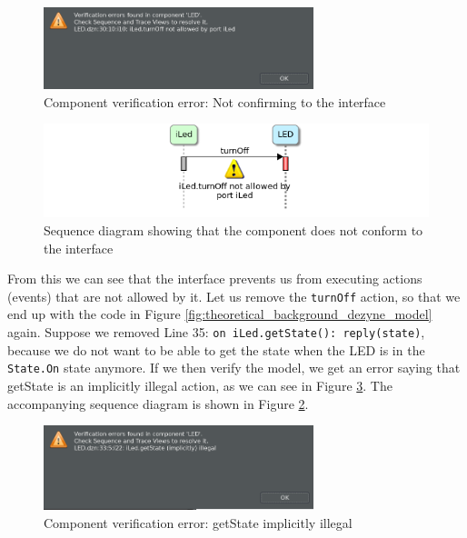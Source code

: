 \documentclass[12pt]{scrreprt}
\begin{document}
\begin{figure}[H]
    \centering
    \includegraphics[width=0.7\textwidth]{Figures/theoretical_background/led_verification_error.png}
    \caption{Component verification error: Not confirming to the interface}
    \label{Component verification error: Not confirming to the interface}
\end{figure}

\begin{figure}[H]
    \centering
    \includegraphics[width=\textwidth]{Figures/theoretical_background/verification_error_in_sequence_diagram.png}
    \caption{Sequence diagram showing that the component does not conform to the interface}
    \label{Sequence diagram showing that the component does not conform to the interface}
\end{figure}

From this we can see that the interface prevents us from executing actions (events) that are not allowed by it. Let us remove the \texttt{turnOff} action, so that we end up with the code in Figure \ref{fig:theoretical_background_dezyne_model} again. Suppose we removed Line 35: \texttt{on iLed.getState(): reply(state)}, because we do not want to be able to get the state when the LED is in the \texttt{State.On} state anymore. If we then verify the model, we get an error saying that getState is an implicitly illegal action, as we can see in Figure \ref{Component verification error: getState implicitly illegal}. The accompanying sequence diagram is shown in Figure \ref{Sequence diagram showing that the component does not conform to the interface}.

\begin{figure}[H]
    \centering
    \includegraphics[width=0.7\textwidth]{Figures/theoretical_background/led_verfication_error_getState.png}
    \caption{Component verification error: getState implicitly illegal}
    \label{Component verification error: getState implicitly illegal}
\end{figure}
\end{document}
